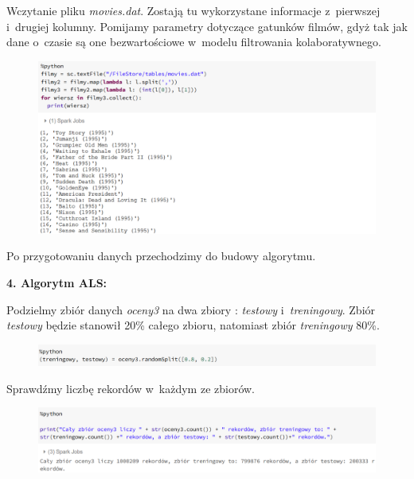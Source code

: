 \documentclass[12pt,a4paper]{report}
\begin{document}
Wczytanie pliku \textit{movies.dat}. 
Zostają tu wykorzystane informacje z~pierwszej i~drugiej kolumny. Pomijamy parametry dotyczące gatunków filmów, gdyż tak jak dane o~czasie są one bezwartościowe w~modelu filtrowania kolaboratywnego.

\begin{figure}[H]
\includegraphics[scale=0.5]{obrazy/ALS5.PNG} 
\end{figure}

Po przygotowaniu danych przechodzimy do budowy algorytmu.
\bigskip

\textbf{4. Algorytm ALS:}

Podzielmy zbiór danych \textit{oceny3} na dwa zbiory : \textit{testowy} i~\textit{treningowy}.
Zbiór \textit{testowy} będzie stanowił 20\% całego zbioru, natomiast zbiór \textit{treningowy} 80\%.

\begin{figure}[H]
\includegraphics[scale=0.5]{obrazy/ALS6.PNG} 
\end{figure}

Sprawdźmy liczbę rekordów w~każdym ze zbiorów.

\begin{figure}[H]
\includegraphics[scale=0.5]{obrazy/ALS7.PNG} 
\end{figure}
\end{document}
